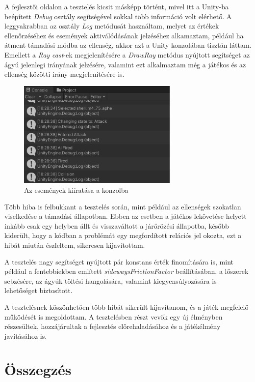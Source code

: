 \documentclass[
]{thesis-ekf}
\theoremstyle{definition}
\theoremstyle{remark}
\begin{document}
A fejlesztői oldalon a tesztelés kicsit másképp történt, mivel itt a Unity-ba beépített \emph{Debug} osztály segítségével sokkal több információ volt elérhető. A leggyakrabban az osztály \emph{Log} metódusát használtam, melyet az értékek ellenőrzéséhez és események aktiválódásának jelzéséhez alkamaztam, például ha átment támadási módba az ellenség, akkor azt a Unity konzolában tisztán láttam. Emellett a \emph{Ray cast}-ek megjelenítésére a \emph{DrawRay} metódus nyújtott segítséget az ágyú jelenlegi irányának jelzésére, valamint ezt alkalmaztam még a játékos és az ellenség közötti irány megjelenítésére is.

\begin{figure}[H]
    \centering
    \includegraphics[width=0.7\textwidth]{screenshots/logging.png}
    \caption{Az események kiíratása a konzolba}
    \label{fig:logging}
\end{figure}

Több hiba is felbukkant a tesztelés során, mint például az ellenségek szokatlan viselkedése a támadási állapotban. Ebben az esetben a játékos lekövetése helyett inkább csak egy helyben állt és visszaváltott a járőrözési állapotba, később kiderült, hogy a kódban a problémát egy megfordított relációs jel okozta, ezt a hibát miután észleltem, sikeresen kijavítottam.

A tesztelés nagy segítséget nyújtott pár konstans érték finomítására is, mint például a fentebbiekben említett \emph{sidewaysFrictionFactor} beállításában, a lőszerek sebzésére, az ágyúk töltési hangolására, valamint kiegyensúlyozására is lehetőséget biztosított.

A tesztelésnek köszönhetően több hibát sikerült kijavítanom, és a játék megfelelő működését is megoldottam. A tesztelésben részt vevők egy új élményben részesültek, hozzájárultak a fejlesztés előrehaladásához és a játékélmény javításához is.

\chapter*{Összegzés}
\end{document}
